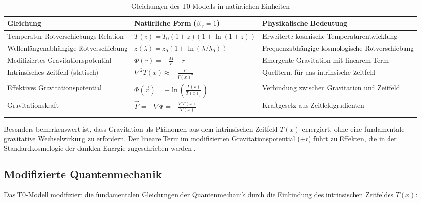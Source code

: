 \documentclass[12pt,a4paper]{article}
\newcommand{\Tfield}{T(x)}
\newcommand{\betaT}{\beta_{\text{T}}}
\begin{document}
	\begin{table}[ht]
		\centering
		\begin{adjustbox}{scale=0.70}
			\begin{tabular}{lll}
				\hline
				\textbf{Gleichung} & \textbf{Natürliche Form ($\betaT = 1$)} & \textbf{Physikalische Bedeutung} \\
				\hline
				Temperatur-Rotverschiebungs-Relation & $T(z) = T_0(1+z)(1+\ln(1+z))$ & Erweiterte kosmische Temperaturentwicklung \\
				Wellenlängenabhängige Rotverschiebung & $z(\lambda) = z_0(1+\ln(\lambda/\lambda_0))$ & Frequenzabhängige kosmologische Rotverschiebung \\
				Modifiziertes Gravitationspotential & $\Phi(r) = -\frac{M}{r} + r$ & Emergente Gravitation mit linearem Term \\
				Intrinsisches Zeitfeld (statisch) & $\nabla^2\Tfield \approx -\frac{\rho}{\Tfield^2}$ & Quellterm für das intrinsische Zeitfeld \\
				Effektives Gravitationspotential & $\Phi(\vec{x}) = -\ln\left(\frac{\Tfield}{\Tfield_0}\right)$ & Verbindung zwischen Gravitation und Zeitfeld \\
				Gravitationskraft & $\vec{F} = -\nabla\Phi = -\frac{\nabla\Tfield}{\Tfield}$ & Kraftgesetz aus Zeitfeldgradienten \\
				\hline
				\multicolumn{2}{c}{} \\
				\hline
			\end{tabular}
		\end{adjustbox}
		\caption{Gleichungen des T0-Modells in natürlichen Einheiten}
		\label{tab:t0_equations}
	\end{table}
	
	Besonders bemerkenswert ist, dass Gravitation als Phänomen aus dem intrinsischen Zeitfeld $\Tfield$ emergiert, ohne eine fundamentale gravitative Wechselwirkung zu erfordern. Der lineare Term im modifizierten Gravitationspotential ($+r$) führt zu Effekten, die in der Standardkosmologie der dunklen Energie zugeschrieben werden \cite{pascher_emergente_2025}.
	
	\subsection{Modifizierte Quantenmechanik}
	
	Das T0-Modell modifiziert die fundamentalen Gleichungen der Quantenmechanik durch die Einbindung des intrinsischen Zeitfeldes $\Tfield$:
	
\end{document}
